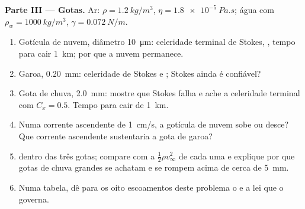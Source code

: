 \begin{problem}
\medskip
\noindent\textbf{Parte III --- Gotas.}
Ar: $\rho = \qty{1.2}{kg/m^3}$, $\eta = \qty{1.8e-5}{Pa.s}$; água com $\rho_w =
\qty{1000}{kg/m^3}$, $\gamma = \qty{0.072}{N/m}$.
\begin{enumerate}[resume]
  \item Gotícula de nuvem, diâmetro \qty{10}{\micro m}: celeridade terminal de Stokes,
        , tempo para cair \qty{1}{km}; por que a nuvem permanece.
  \item Garoa, \qty{0.20}{mm}: celeridade de Stokes e ; Stokes
        ainda é confiável?
  \item Gota de chuva, \qty{2.0}{mm}: mostre que Stokes falha e ache a celeridade
        terminal com $C_x = 0.5$. Tempo para cair de \qty{1}{km}.
  \item Numa corrente ascendente de \qty{1}{cm/s}, a gotícula de nuvem sobe ou
        desce? Que corrente ascendente sustentaria a gota de garoa?
  \item {} dentro das três gotas; compare com a
         $\tfrac12\rho v_\infty^2$ de cada uma e explique por que
        gotas de chuva grandes se achatam e se rompem acima de cerca de \qty{5}{mm}.
  \item Numa tabela, dê para os oito escoamentos deste problema o
         e a lei que o governa.
\end{enumerate}
\end{problem}
